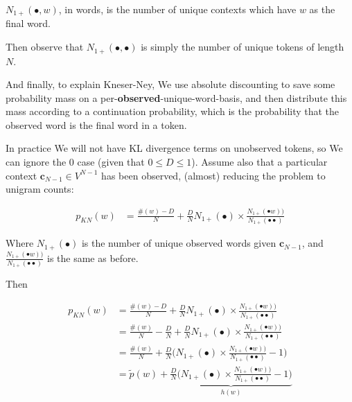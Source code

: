 \documentclass{article}
\newcommand{\context}{\boldsymbol{c}}
\begin{document}
	$N_{1+}(\bullet, w)$, in words, is the number of unique contexts which have $w$ as the final word.
	
	Then observe that $N_{1+}(\bullet, \bullet)$ is simply the number of unique tokens of length $N$.
	
	And finally, to explain Kneser-Ney, We use absolute discounting to save some probability mass on a per-\textbf{observed}-unique-word-basis, and then distribute this mass according to a continuation probability, which is the probability that the observed word is the final word in a token.
	
	In practice We will not have KL divergence terms on unobserved tokens, so We can ignore the $0$ case (given that $0\le D \le 1$). Assume also that a particular context $\context_{N-1}\in V^{N-1}$ has been observed, (almost) reducing the problem to unigram counts:
	
	\begin{align} 
		p_{KN}(w) &= \frac{\#(w) - D}{N} + \frac{D}{N} N_{1+} (\bullet) \times \frac{N_{1+}(\bullet w))}{N_{1+}(\bullet \bullet)}
	\end{align}
	
	Where $N_{1+} (\bullet)$ is the number of unique observed words given $\context_{N-1}$, and $\frac{N_{1+}(\bullet w))}{N_{1+}(\bullet \bullet)}$ is the same as before.
	
	Then
	
	\begin{align} 
		p_{KN}(w) &= \frac{\#(w) - D}{N} + \frac{D}{N} N_{1+} (\bullet) \times \frac{N_{1+}(\bullet w))}{N_{1+}(\bullet \bullet)}\\
		&= \frac{\#(w)}{N} - \frac{D}{N} + \frac{D}{N} N_{1+} (\bullet) \times \frac{N_{1+}(\bullet w))}{N_{1+}(\bullet \bullet)}\\
		&= \frac{\#(w)}{N} + \frac{D}{N}\bigg( N_{1+} (\bullet) \times \frac{N_{1+}(\bullet w))}{N_{1+}(\bullet \bullet)} - 1 \bigg)\\
		&= \tilde{p}(w) + \underbrace{\frac{D}{N}\bigg( N_{1+} (\bullet) \times \frac{N_{1+}(\bullet w))}{N_{1+}(\bullet \bullet)} - 1 \bigg)}_{h(w)}
	\end{align}

		
		
		
		
		
		
		
		
		
		
		
		
		
		
		
		
\end{document}

